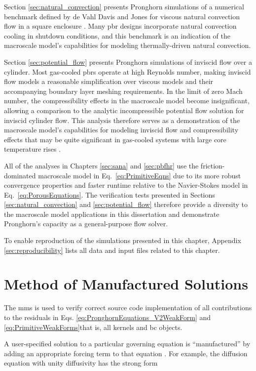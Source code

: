 Section \ref{sec:natural_convection} presents Pronghorn simulations of a numerical benchmark defined by de Vahl Davis and Jones for viscous natural convection flow in a square enclosure \cite{davis}. Many \gls{pbr} designs incorporate natural convection cooling in shutdown conditions, and this benchmark is an indication of the macroscale model's capabilities for modeling thermally-driven natural convection.

Section \ref{sec:potential_flow} presents Pronghorn simulations of inviscid flow over a cylinder. Most gas-cooled \glspl{pbr} operate at high Reynolds number, making inviscid flow models a reasonable simplification over viscous models and their accompanying boundary layer meshing requirements. In the limit of zero Mach number, the compressibility effects in the macroscale model become insignificant, allowing a comparison to the analytic incompressible potential flow solution for inviscid cylinder flow. This analysis therefore serves as a demonstration of the macroscale model's capabilities for modeling inviscid flow and compressibility effects that may be quite significant in gas-cooled systems with large core temperature rises \cite{martineau}.

All of the analyses in Chapters \ref{sec:sana} and \ref{sec:pbfhr} use the friction-dominated macroscale model in Eq.\ \eqref{eq:PrimitiveEqns} due to its more robust convergence properties and faster runtime relative to the Navier-Stokes model in Eq.\ \eqref{eq:PorousEquations}. The verification tests presented in Sections \ref{sec:natural_convection} and \ref{sec:potential_flow} therefore provide a diversity to the macroscale model applications in this dissertation and demonstrate Pronghorn's capacity as a general-purpose flow solver.

To enable reproduction of the simulations presented in this chapter, Appendix \ref{sec:reproducibility} lists all data and input files related to this chapter.

\section{Method of Manufactured Solutions}
\label{sec:mms}

The \gls{mms} is used to verify correct source code implementation of all contributions to the residuals in Eqs. \eqref{eq:PronghornEquations_V2WeakForm} and \eqref{eq:PrimitiveWeakForms}\mdash that is, all kernels and \gls{bc} objects.

A user-specified solution to a particular governing equation is ``manufactured'' by adding an appropriate forcing term to that equation \cite{roache}. For example, the diffusion equation with unity diffusivity has the strong form

